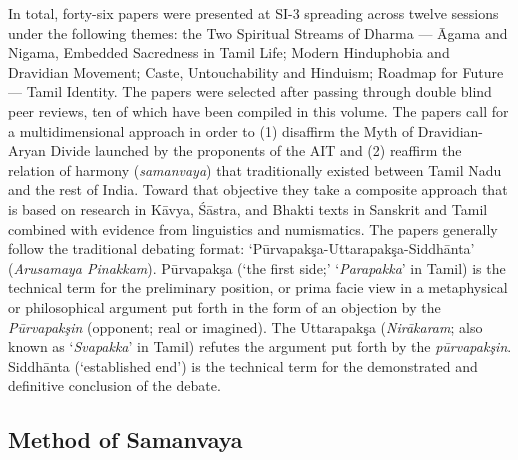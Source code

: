 In total, forty-six papers were presented at SI-3 spreading across twelve sessions under the following themes: the Two Spiritual Streams of Dharma — Āgama and Nigama, Embedded Sacredness in Tamil Life; Modern Hinduphobia and Dravidian Movement; Caste, Untouchability and Hinduism; Roadmap for Future — Tamil Identity. The papers were selected after passing through double blind peer reviews, ten of which have been compiled in this volume. The papers call for a multidimensional approach in order to (1) disaffirm the Myth of Dravidian-Aryan Divide launched by the proponents of the AIT and (2) reaffirm the relation of harmony (\textit{samanvaya}) that traditionally existed between Tamil Nadu and the rest of India. Toward that objective they take a composite approach that is based on research in Kāvya, Śāstra, and Bhakti texts in Sanskrit and Tamil combined with evidence from linguistics and numismatics. The papers generally follow the traditional debating format: ‘Pūrvapakşa-Uttarapakşa-Siddhānta’ (\textit{Arusamaya Pinakkam}). Pūrvapakşa (‘the first side;’ ‘\textit{Parapakka}’ in Tamil) is the technical term for the preliminary position, or prima facie view in a metaphysical or philosophical argument put forth in the form of an objection by the \textit{Pūrvapakşin} (opponent; real or imagined). The Uttarapakşa (\textit{Nirākaram}; also known as ‘\textit{Svapakka}’ in Tamil) refutes the argument put forth by the \textit{pūrvapakşin}. Siddhānta (‘established end’) is the technical term for the demonstrated and definitive conclusion of the debate.

\subsection*{Method of Samanvaya}

